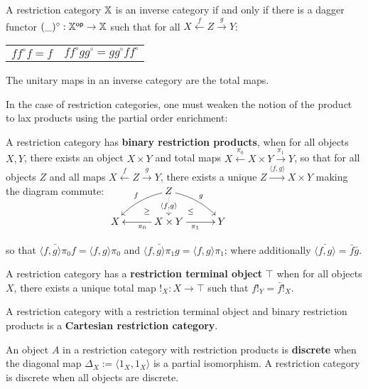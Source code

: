 \begin{theorem}\cite[Thm. 2.20]{cockett}
A restriction category $\mathbb{X}$ is an inverse category if and only if there is a dagger functor $(\_)^\circ:\mathbb{X}^{\mathsf{op}}\to\mathbb{X}$ such that for all $X\xleftarrow{f} Z \xrightarrow{g} Y$:
\begin{center}
\begin{tabular}{cc}
 $f f^\circ f = f$ & 
 $f f ^\circ gg^\circ = gg^\circ f f ^\circ $
\end{tabular}
\end{center}
\end{theorem}

The unitary maps in an inverse category are the total maps.



In the case of restriction categories, one must weaken the notion of the product to lax products using the partial order enrichment:


\begin{definition}\cite{restiii}
A restriction category has {\bf binary restriction products}, when for all objects  $X,Y$, there exists an object $X\times Y$ and total maps $X \xleftarrow{\pi_0}  X\times Y \xrightarrow{\pi_1} Y$, so that for all objects $Z$ and all maps $X \xleftarrow{f} Z \xrightarrow{g} Y$, there exists a unique $Z\xrightarrow{\langle f,g \rangle} X\times Y$ making the diagram commute:
\hfil
$
\xymatrixrowsep{0.2cm}
\xymatrixcolsep{0.4cm}
\xymatrix{
&& Z\ar@{..>}[dd]|-{\langle f, g\rangle} \ar@/_/[ddll]_f \ar@/^/[ddrr]^g &&\\
& \ar@{}[dr]|-{\geq} && \ar@{}[dl] |-{\leq} &\\
X &&  X\times Y \ar[rr]_{\pi_1} \ar[ll]^{\pi_0}  && Y
}
$

so that $\bar{\langle f, g\rangle \pi_0} f = \langle f, g\rangle \pi_0$ and $\bar{\langle f, g\rangle \pi_1} g = \langle f, g\rangle \pi_1$;
where additionally $\bar{\langle f, g\rangle} =  \bar f \bar g$.


A restriction category has a {\bf restriction terminal object} $\top$ when for all objects $X$, there exists a unique total map $!_X:X\to\top$ such that $f !_Y = \bar f !_X$.

A restriction category with a restriction terminal object and binary restriction products is a {\bf Cartesian restriction category}.


An object $A$ in a restriction category with restriction products is {\bf discrete} when the diagonal map $\Delta_X:=\langle 1_X, 1_X\rangle$ is a partial isomorphism. A restriction category is discrete when all objects are discrete. 
\end{definition}




